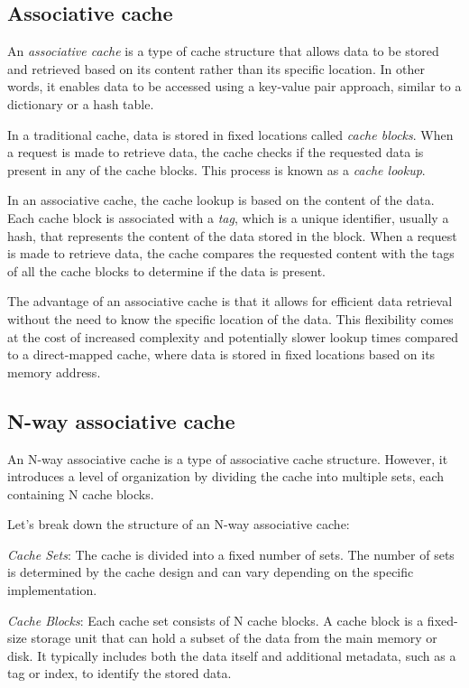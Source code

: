 \documentclass[12pt]{article}
\begin{document}
\subsection{Associative cache}

An \textit{associative cache} is a type of cache structure that allows data to be stored and retrieved based on its content rather than its specific location. In other words, it enables data to be accessed using a key-value pair approach, similar to a dictionary or a hash table.

In a traditional cache, data is stored in fixed locations called \textit{cache blocks}. When a request is made to retrieve data, the cache checks if the requested data is present in any of the cache blocks. This process is known as a \textit{cache lookup}.

In an associative cache, the cache lookup is based on the content of the data. Each cache block is associated with a \textit{tag}, which is a unique identifier, usually a hash, that represents the content of the data stored in the block. When a request is made to retrieve data, the cache compares the requested content with the tags of all the cache blocks to determine if the data is present.

The advantage of an associative cache is that it allows for efficient data retrieval without the need to know the specific location of the data. This flexibility comes at the cost of increased complexity and potentially slower lookup times compared to a direct-mapped cache, where data is stored in fixed locations based on its memory address.

\subsection{N-way associative cache}

An N-way associative cache is a type of associative cache structure. However, it introduces a level of organization by dividing the cache into multiple sets, each containing N cache blocks.

Let's break down the structure of an N-way associative cache:

\textit{Cache Sets}: The cache is divided into a fixed number of sets. The number of sets is determined by the cache design and can vary depending on the specific implementation.

\textit{Cache Blocks}: Each cache set consists of N cache blocks. A cache block is a fixed-size storage unit that can hold a subset of the data from the main memory or disk. It typically includes both the data itself and additional metadata, such as a tag or index, to identify the stored data.
\end{document}
